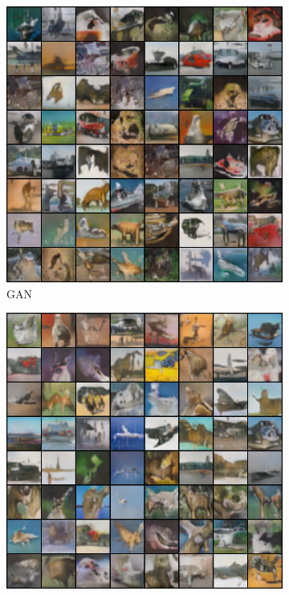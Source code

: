 \begin{figure}[htbp]
    \centering
    \begin{subfigure}[b]{0.49\textwidth}
       \centering
       \includegraphics[width=1.0\textwidth]{figures/cifar/192_base_raw_base.png}
       \caption{GAN}
    \end{subfigure}
    \begin{subfigure}[b]{0.49\textwidth}
       \centering
       \includegraphics[width=1.0\textwidth]{figures/cifar/192_base_raw_reject.png}

\end{subfigure}
\end{figure}
